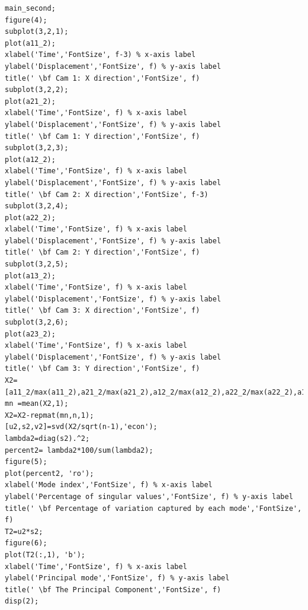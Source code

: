 \documentclass[a4paper]{article}
\begin{document}
\begin{lstlisting}[style=myMatlabstyle]
main_second;
figure(4);
subplot(3,2,1);
plot(a11_2);
xlabel('Time','FontSize', f-3) % x-axis label
ylabel('Displacement','FontSize', f) % y-axis label
title(' \bf Cam 1: X direction','FontSize', f)
subplot(3,2,2);
plot(a21_2);
xlabel('Time','FontSize', f) % x-axis label
ylabel('Displacement','FontSize', f) % y-axis label
title(' \bf Cam 1: Y direction','FontSize', f)
subplot(3,2,3);
plot(a12_2);
xlabel('Time','FontSize', f) % x-axis label
ylabel('Displacement','FontSize', f) % y-axis label
title(' \bf Cam 2: X direction','FontSize', f-3)
subplot(3,2,4);
plot(a22_2);
xlabel('Time','FontSize', f) % x-axis label
ylabel('Displacement','FontSize', f) % y-axis label
title(' \bf Cam 2: Y direction','FontSize', f)
subplot(3,2,5);
plot(a13_2);
xlabel('Time','FontSize', f) % x-axis label
ylabel('Displacement','FontSize', f) % y-axis label
title(' \bf Cam 3: X direction','FontSize', f)
subplot(3,2,6);
plot(a23_2);
xlabel('Time','FontSize', f) % x-axis label
ylabel('Displacement','FontSize', f) % y-axis label
title(' \bf Cam 3: Y direction','FontSize', f)
X2=[a11_2/max(a11_2),a21_2/max(a21_2),a12_2/max(a12_2),a22_2/max(a22_2),a13_2/max(a13_2),a23_2/max(a23_2)];
mn =mean(X2,1);
X2=X2-repmat(mn,n,1);
[u2,s2,v2]=svd(X2/sqrt(n-1),'econ');
lambda2=diag(s2).^2;
percent2= lambda2*100/sum(lambda2);
figure(5);
plot(percent2, 'ro');
xlabel('Mode index','FontSize', f) % x-axis label
ylabel('Percentage of singular values','FontSize', f) % y-axis label
title(' \bf Percentage of variation captured by each mode','FontSize', f)
T2=u2*s2;
figure(6);
plot(T2(:,1), 'b');
xlabel('Time','FontSize', f) % x-axis label
ylabel('Principal mode','FontSize', f) % y-axis label
title(' \bf The Principal Component','FontSize', f)
disp(2);



\end{lstlisting}
\end{document}
